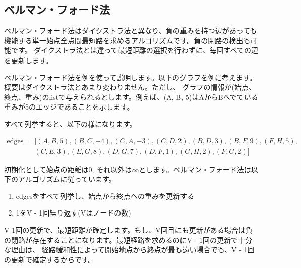 \documentclass{jlreq}
\begin{document}
\newpage

\subsection{ベルマン・フォード法}
ベルマン・フォード法はダイクストラ法と異なり、負の重みを持つ辺があっても機能する単一始点全点間最短路を求めるアルゴリズムです。負の閉路の検出も可能です。
ダイクストラ法とは違って最短距離の選択を行わずに、毎回すべての辺を更新します。

ベルマン・フォード法を例を使って説明します。以下のグラフを例に考えます。概要はダイクストラ法とあまり変わりません。ただし、
グラフの情報が(始点、終点、重み)のlistで与えられるとします。例えば、(A, B, 5)はAからBへでている重みが5のエッジであることを示します。

すべて列挙すると、以下の様になります。

\begin{equation*}
  \begin{aligned}
    \text{edges} =
    &[(A, B, 5), (B, C, -4), (C, A, -3), (C, D, 2), (B, D, 3), (B, F, 9), (F, H, 5), \\
    &(C, E, 3), (E, G, 8), (D, G, 7), (D, F, 1), (G, H, 2), (F, G, 2)]
  \end{aligned}
\end{equation*}

初期化として始点の距離は0, それ以外は$\infty$とします。ベルマン・フォード法は以下のアルゴリズムに従っています。

\begin{enumerate}
  \item edgesをすべて列挙し、始点から終点への重みを更新する
  \item 1をV - 1回繰り返す(Vはノードの数)
\end{enumerate}

V-1回の更新で、最短距離が確定します。もし、V回目にも更新がある場合は負の閉路が存在することになります。最短経路を求めるのにV - 1回の更新で十分な理由は、
経路緩和性によって開始地点から終点が最も遠い場合でも、V - 1回の更新で確定するからです。
\end{document}
